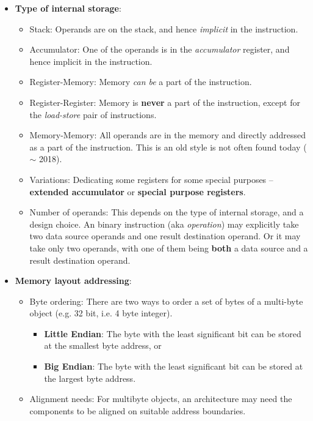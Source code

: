 \begin{itemize}
\item \textbf{Type of internal storage}:
  \begin{itemize}
  \item Stack: Operands are on the stack, and hence \emph{implicit} in
    the instruction.
  \item Accumulator: One of the  operands is in the \emph{accumulator}
    register, and hence implicit in the instruction.
  \item  Register-Memory:   Memory  \emph{can   be}  a  part   of  the
    instruction.
  \item  Register-Register: Memory  is  \textbf{never} a  part of  the
    instruction,   except   for    the   \emph{load-store}   pair   of
    instructions.
  \item Memory-Memory:  All operands  are in  the memory  and directly
    addressed as a  part of the instruction.  This is  an old style is
    not often found today ($\sim$ 2018).
  \item  Variations:  Dedicating  some   registers  for  some  special
    purposes  --  \textbf{extended   accumulator}  or  \textbf{special
      purpose registers}.
  \item  Number of  operands: This  depends  on the  type of  internal
    storage,  and  a  design   choice.   An  binary  instruction  (aka
    \emph{operation}) may explicitly take two data source operands and
    one result destination operand.  Or it may take only two operands,
    with one  of them being \textbf{both}  a data source and  a result
    destination operand.
  \end{itemize}
\item \textbf{Memory layout addressing}:
  \begin{itemize}
  \item Byte ordering: There are two ways to order a set of bytes of a
    multi-byte object  (e.g. 32 bit,  i.e. 4 byte integer).
    \begin{itemize}
    \item \textbf{Little Endian}: The  byte with the least significant
      bit can  be stored at  the smallest byte  address, or 
    \item \textbf{Big Endian}: The byte with the least significant bit
      can be stored at the largest byte address.
    \end{itemize}
  \item Alignment  needs: For  multibyte objects, an  architecture may
    need the components to be  aligned on suitable address boundaries.

\end{itemize}
\end{itemize}
